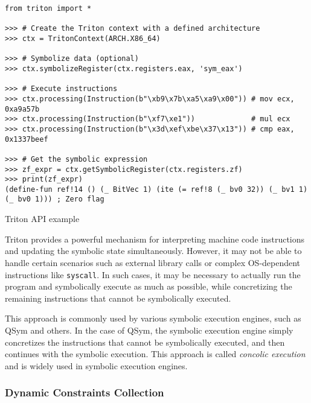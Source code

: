 \begin{listing}[htp]
	\centering
	\begin{minipage}{.9\linewidth}
		\begin{verbatim}
from triton import *

>>> # Create the Triton context with a defined architecture
>>> ctx = TritonContext(ARCH.X86_64)

>>> # Symbolize data (optional)
>>> ctx.symbolizeRegister(ctx.registers.eax, 'sym_eax')

>>> # Execute instructions
>>> ctx.processing(Instruction(b"\xb9\x7b\xa5\xa9\x00")) # mov ecx, 0xa9a57b
>>> ctx.processing(Instruction(b"\xf7\xe1"))             # mul ecx
>>> ctx.processing(Instruction(b"\x3d\xef\xbe\x37\x13")) # cmp eax, 0x1337beef

>>> # Get the symbolic expression
>>> zf_expr = ctx.getSymbolicRegister(ctx.registers.zf)
>>> print(zf_expr)
(define-fun ref!14 () (_ BitVec 1) (ite (= ref!8 (_ bv0 32)) (_ bv1 1) (_ bv0 1))) ; Zero flag
	\end{verbatim}
	\end{minipage}
	\caption{Triton API example}
	\label{lst:example4}
\end{listing}

Triton provides a powerful mechanism for interpreting machine code instructions and updating the symbolic state simultaneously. However, it may not be able to handle certain scenarios such as external library calls or complex OS-dependent instructions like \texttt{syscall}. In such cases, it may be necessary to actually run the program and symbolically execute as much as possible, while concretizing the remaining instructions that cannot be symbolically executed.

This approach is commonly used by various symbolic execution engines, such as QSym \cite{qsym-usenix2018} and others. In the case of QSym, the symbolic execution engine simply concretizes the instructions that cannot be symbolically executed, and then continues with the symbolic execution. This approach is called \textit{concolic execution} and is widely used in symbolic execution engines.


\subsubsection{Dynamic Constraints Collection}

